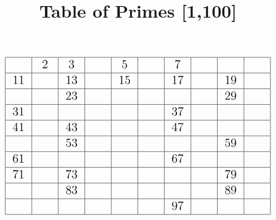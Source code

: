 \documentclass[12pt,a4paper]{article}
\title{Table of Primes [1,100]}
\author{}
\date{}
\begin{document}
\maketitle

\[\Large\begin{array}{|c|c|c|c|c|c|c|c|c|c|}
	\hline
	\phantom{100}&2&3&\phantom{100}&5&\phantom{100}&7&\phantom{100}&\phantom{100}&\phantom{100}\\
	\hline
	11&\phantom{100}&13&\phantom{100}&15&\phantom{100}&17&\phantom{100}&19&\\
	\hline
	&&23&&\phantom{100}&&\phantom{100}&&29&\\
	\hline
	31&&\phantom{100}&&&&37&&&\\
	\hline
	41&&43&&&&47&&&\\
	\hline
	&&53&&&&&&59&\\
	\hline
	61&&&&&&67&&&\\
	\hline
	71&&73&&&&&&79&\\
	\hline
	&&83&&&&&&89&\\
	\hline
	&&&&&&97&&&\\
	\hline
\end{array}\]
\end{document}
